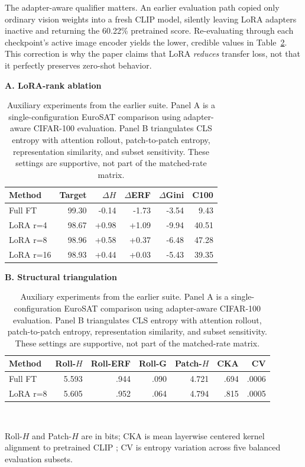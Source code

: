 \documentclass[conference]{IEEEtran}
\begin{document}
The adapter-aware qualifier matters. An earlier evaluation path copied only ordinary vision weights into a fresh CLIP model, silently leaving LoRA adapters inactive and returning the 60.22\% pretrained score. Re-evaluating through each checkpoint's active image encoder yields the lower, credible values in Table~\ref{tab:auxiliary}. This correction is why the paper claims that LoRA \emph{reduces} transfer loss, not that it perfectly preserves zero-shot behavior.

\begin{table}[!t]
\caption{Auxiliary experiments from the earlier suite. Panel A is a single-configuration EuroSAT comparison using adapter-aware CIFAR-100 evaluation. Panel B triangulates CLS entropy with attention rollout, patch-to-patch entropy, representation similarity, and subset sensitivity. These settings are supportive, not part of the matched-rate matrix.}
\label{tab:auxiliary}
\centering
\scriptsize
\begin{minipage}[t]{0.49\textwidth}
\centering
\textbf{A. LoRA-rank ablation}\\[2pt]
\setlength{\tabcolsep}{3.2pt}
\begin{tabular}{lrrrrr}
\toprule
Method & Target & $\Delta H$ & $\Delta$ERF & $\Delta$Gini & C100 \\
\midrule
Full FT & 99.30 & -0.14 & -1.73 & -3.54 & 9.43 \\
LoRA r=4 & 98.67 & +0.98 & +1.09 & -9.94 & 40.51 \\
LoRA r=8 & 98.96 & +0.58 & +0.37 & -6.48 & 47.28 \\
LoRA r=16 & 98.93 & +0.44 & +0.03 & -5.43 & 39.35 \\
\bottomrule
\end{tabular}
\end{minipage}\hfill
\begin{minipage}[t]{0.49\textwidth}
\centering
\textbf{B. Structural triangulation}\\[2pt]
\setlength{\tabcolsep}{3.0pt}
\begin{tabular}{lrrrrrr}
\toprule
Method & Roll-$H$ & Roll-ERF & Roll-G & Patch-$H$ & CKA & CV \\
\midrule
Full FT & 5.593 & .944 & .090 & 4.721 & .694 & .0006 \\
LoRA r=8 & 5.605 & .952 & .064 & 4.794 & .815 & .0005 \\
\bottomrule
\end{tabular}\\[3pt]
\raggedright Roll-$H$ and Patch-$H$ are in bits; CKA is mean layerwise centered kernel alignment to pretrained CLIP \cite{kornblith2019similarity}; CV is entropy variation across five balanced evaluation subsets.
\end{minipage}
\end{table}
\end{document}
